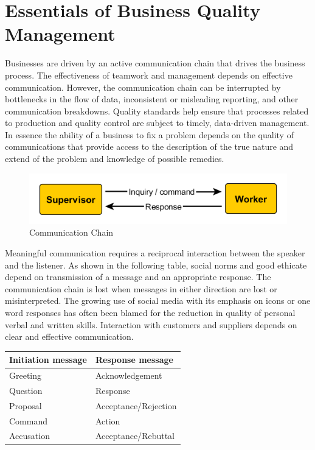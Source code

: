\documentclass[]{book}
\begin{document}
\hypertarget{essentials-of-business-quality-management}{%
\section{Essentials of Business Quality Management}\label{essentials-of-business-quality-management}}

Businesses are driven by an active communication chain that drives the business process. The effectiveness of teamwork and management depends on effective communication. However, the communication chain can be interrupted by bottlenecks in the flow of data, inconsistent or misleading reporting, and other communication breakdowns. Quality standards help ensure that processes related to production and quality control are subject to timely, data-driven management. In essence the ability of a business to fix a problem depends on the quality of communications that provide access to the description of the true nature and extend of the problem and knowledge of possible remedies.

\begin{figure}
\centering
\includegraphics{images/communication.png}
\caption{Communication Chain}
\end{figure}

Meaningful communication requires a reciprocal interaction between the speaker and the listener. As shown in the following table, social norms and good ethicate depend on transmission of a message and an appropriate response. The communication chain is lost when messages in either direction are lost or misinterpreted. The growing use of social media with its emphasis on icons or one word responses has often been blamed for the reduction in quality of personal verbal and written skills. Interaction with customers and suppliers depends on clear and effective communication.

\begin{longtable}[]{@{}ll@{}}
\toprule
Initiation message & Response message\tabularnewline
\midrule
\endhead
Greeting & Acknowledgement\tabularnewline
Question & Response\tabularnewline
Proposal & Acceptance/Rejection\tabularnewline
Command & Action\tabularnewline
Accusation & Acceptance/Rebuttal\tabularnewline
\bottomrule
\end{longtable}
\end{document}
